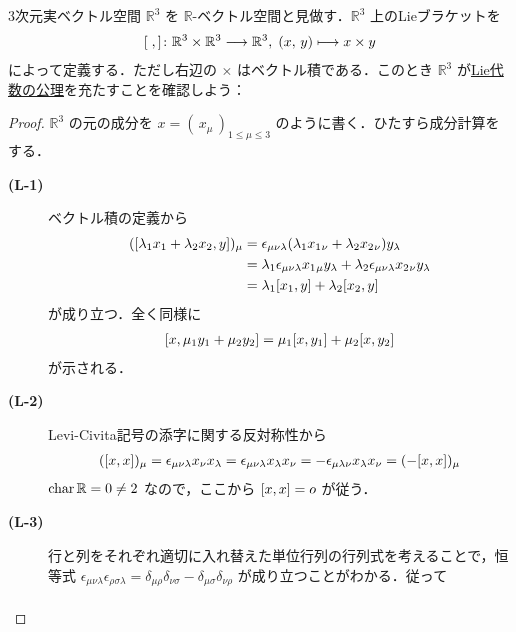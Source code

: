 \documentclass[rep_main]{subfiles}
\begin{document}
\begin{myexample}[label=ex:R3-LieAlg]{3次元実ベクトル空間}
    $\mathbb{R}^3$ を $\mathbb{R}$-ベクトル空間と見做す．$\mathbb{R}^3$ 上のLieブラケットを
    \begin{align}
        \comm{\;}{\,} \colon \mathbb{R}^3 \times \mathbb{R}^3 \lto \mathbb{R}^3,\; (x,\, y) \lmto x \times y
    \end{align}
    によって定義する．ただし右辺の $\times$ はベクトル積である．このとき $\mathbb{R}^3$ が\hyperref[ax:LieAlg]{Lie代数の公理}を充たすことを確認しよう：
    \begin{proof}
        $\mathbb{R}^3$ の元の成分を $x = (\, x_\mu \,)_{1 \le \mu \le 3}$ のように書く．ひたすら成分計算をする．
        \begin{description}
            \item[\textbf{(L-1)}] ベクトル積の定義から
            \begin{align}
                (\comm{\lambda_1 x_1 + \lambda_2 x_2}{y} )_\mu 
                &= \epsilon_{\mu\nu\lambda} (\lambda_1 x_1{}_\nu + \lambda_2 x_2{}_\nu) y_\lambda \\
                &= \lambda_1 \epsilon_{\mu\nu\lambda} x_1{}_\mu y_\lambda + \lambda_2 \epsilon_{\mu\nu\lambda} x_2{}_\nu y_\lambda \\
                &= \lambda_1 \comm{x_1}{y} + \lambda_2 \comm{x_2}{y}
            \end{align}
            が成り立つ．全く同様に
            \begin{align}
                \comm{x}{\mu_1 y_1 + \mu_2 y_2} = \mu_1 \comm{x}{y_1} + \mu_2 \comm{x}{y_2}
            \end{align}
            が示される．
            \item[\textbf{(L-2)}] Levi-Civita記号の添字に関する反対称性から
            \begin{align}
                (\comm{x}{x})_\mu = \epsilon_{\mu\nu\lambda} x_\nu x_\lambda = \epsilon_{\mu\nu\lambda} x_\lambda x_\nu = - \epsilon_{\mu\lambda\nu} x_\lambda x_\nu = (- \comm{x}{x})_\mu
            \end{align}
            $\operatorname{char} \mathbb{R} = 0 \neq 2$ なので，ここから $\comm{x}{x} = o$ が従う．
            \item[\textbf{(L-3)}] 行と列をそれぞれ適切に入れ替えた単位行列の行列式を考えることで，恒等式 $\epsilon_{\mu\nu\lambda} \epsilon_{\rho\sigma \lambda} = \delta_{\mu\rho} \delta_{\nu\sigma} - \delta_{\mu\sigma} \delta_{\nu\rho}$ が成り立つことがわかる．従って
            \begin{align}

\end{align}
\end{description}
\end{proof}
\end{myexample}
\end{document}
